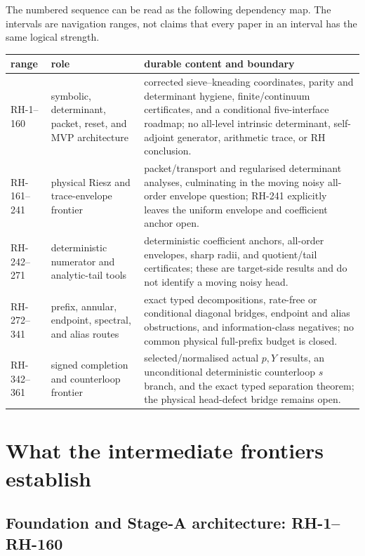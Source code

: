 \documentclass[11pt]{article}
\theoremstyle{definition}
\theoremstyle{remark}
\newcommand{\RH}{RH}
\begin{document}
The numbered sequence can be read as the following dependency map.  The
intervals are navigation ranges, not claims that every paper in an interval
has the same logical strength.

\begin{longtable}{>{\raggedright\arraybackslash}p{1.4cm}>{\raggedright\arraybackslash}p{4.0cm}>{\raggedright\arraybackslash}p{8.0cm}}
\toprule
range & role & durable content and boundary \\
\midrule
\endhead
\RH-1--160 & symbolic, determinant, packet, reset, and MVP architecture &
 corrected sieve--kneading coordinates, parity and determinant hygiene,
 finite/continuum certificates, and a conditional five-interface roadmap;
 no all-level intrinsic determinant, self-adjoint generator, arithmetic trace,
 or RH conclusion. \\
\RH-161--241 & physical Riesz and trace-envelope frontier &
 packet/transport and regularised determinant analyses, culminating in the
 moving noisy all-order envelope question; RH-241 explicitly leaves the
 uniform envelope and coefficient anchor open. \\
\RH-242--271 & deterministic numerator and analytic-tail tools &
 deterministic coefficient anchors, all-order envelopes, sharp radii, and
 quotient/tail certificates; these are target-side results and do not identify
 a moving noisy head. \\
\RH-272--341 & prefix, annular, endpoint, spectral, and alias routes &
 exact typed decompositions, rate-free or conditional diagonal bridges,
 endpoint and alias obstructions, and information-class negatives; no common
 physical full-prefix budget is closed. \\
\RH-342--361 & signed completion and counterloop frontier &
 selected/normalised actual $p,Y$ results, an unconditional deterministic
 counterloop $s$ branch, and the exact typed separation theorem; the physical
 head-defect bridge remains open. \\
\bottomrule
\end{longtable}

\section{What the intermediate frontiers establish}

\subsection{Foundation and Stage-A architecture: RH-1--RH-160}
\end{document}
